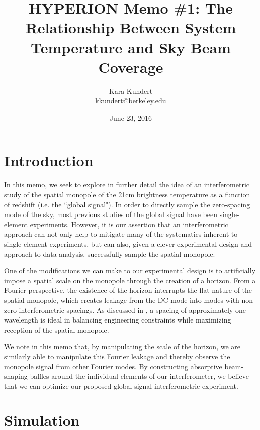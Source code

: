 \documentclass[11pt]{article}
\makeatletter
\newcommand{\thetitle}{HYPERION Memo \#1: The Relationship Between System 
Temperature and Sky Beam Coverage}
\newcommand{\theauthor}{Kara Kundert}
\newcommand{\theauthorsemail}{kkundert@berkeley.edu}
\newcommand{\thedate}{June 23, 2016}
\makeatother
\begin{document}
\title{
    \sffamily\bfseries\huge
    \thetitle \\
}
\author{
    \sffamily\theauthor \\
    \sffamily\theauthorsemail
}
\date{\thedate}
\maketitle
\sloppy

\section{Introduction}

In this memo, we seek to explore in further detail the idea of an 
interferometric study of the spatial monopole of the 21cm brightness 
temperature as a function of redshift (i.e. the ``global signal"). In order to 
directly sample the zero-spacing mode of the sky, most previous studies of the 
global signal have been single-element experiments. However, it is our 
assertion that an interferometric approach can not only help to mitigate many 
of the systematics inherent to single-element experiments, but can also, given 
a clever experimental design and approach to data analysis, successfully sample 
the spatial monopole. 

One of the modifications we can make to our experimental design is to 
artificially impose a spatial scale on the monopole through the creation of a 
horizon. From a Fourier perspective, the existence of the horizon interrupts 
the flat nature of the spatial monopole, which creates leakage from the DC-mode 
into modes with non-zero interferometric spacings. As discussed in 
\cite{presley2015}, a spacing of approximately one wavelength is ideal in 
balancing engineering constraints while maximizing reception of the spatial 
monopole.

We note in this memo that, by manipulating the scale of the horizon, we are 
similarly able to manipulate this Fourier leakage and thereby observe the 
monopole signal from other Fourier modes.  By constructing absorptive 
beam-shaping baffles around the individual elements of our interferometer, we 
believe that we can optimize our proposed global signal interferometric 
experiment.

\section{Simulation}
\end{document}
